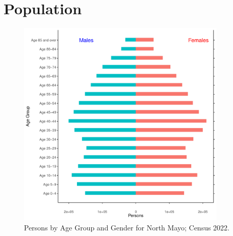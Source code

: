 \documentclass{article}
\begin{document}
\pagebreak

\section{Population} 
\label{sect:Pop}

\begin{figure}[h]
	\centering
	\includegraphics[width = 100mm]{../figures/PyramidPlot.pdf}
	\caption{Persons by Age Group and Gender for North Mayo; Census 2022.}
	\label{fig:2ae19629-1a6a-13a3-e055-000000000001}
	\end{figure}
\end{document}
